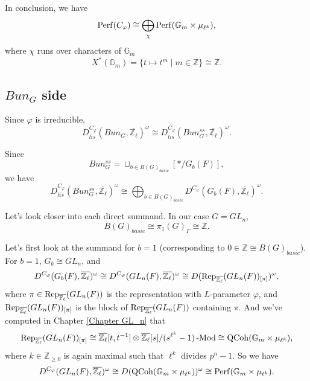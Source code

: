 In conclusion, we have 
$$\operatorname{\operatorname{Perf}}(C_{\varphi}) \cong \bigoplus_{\chi}\operatorname{\operatorname{Perf}}(\mathbb{G}_m \times \mu_{\ell^k}),$$
where $\chi$ runs over characters of $\mathbb{G}_m$ 
$$X^*(\mathbb{G}_m)=\{t \mapsto t^m \;|\; m \in \mathbb{Z}\} \cong \mathbb{Z}.$$


\subsection{$Bun_G$ side}

Since $\varphi$ is irreducible, 
$$D^{C_{\varphi}}_{lis}(Bun_G, \overline{\mathbb{Z}_{\ell}})^{\omega} \cong D^{C_{\varphi}}_{lis}(Bun_G^{ss}, \overline{\mathbb{Z}_{\ell}})^{\omega}.$$

Since
$$Bun_G^{ss}=\sqcup_{b \in B(G)_{basic}}[*/G_b(F)],$$
we have 
$$D^{C_{\varphi}}_{lis}(Bun_G^{ss}, \overline{\mathbb{Z}_{\ell}})^{\omega} \cong \bigoplus_{b \in B(G)_{basic}}D^{C_{\varphi}}(G_b(F), \overline{\mathbb{Z}_{\ell}})^{\omega}.$$

Let's look closer into each direct summand. In our case $G=GL_n$, 
$$B(G)_{basic} \cong \pi_1(G)_{\Gamma} \cong \mathbb{Z}.$$ 

Let's first look at the summand for $b=1$ (corresponding to $0 \in \mathbb{Z} \cong B(G)_{basic}$). For $b=1$, $G_b \cong GL_n$, and 
$$D^{C_{\varphi}}(G_b(F), \overline{\mathbb{Z}_{\ell}})^{\omega} \cong D^{C_{\varphi}}(GL_n(F), \overline{\mathbb{Z}_{\ell}})^{\omega} \cong D(\operatorname{\operatorname{Rep}}_{\overline{\mathbb{Z}_{\ell}}}(GL_n(F))_{[\pi]})^{\omega},$$
where $\pi \in \operatorname{\operatorname{Rep}}_{\overline{\mathbb{F}_{\ell}}}(GL_n(F))$ is the representation with $L$-parameter $\varphi$, and $\operatorname{\operatorname{Rep}}_{\overline{\mathbb{Z}_{\ell}}}(GL_n(F))_{[\pi]}$ is the block of $\operatorname{\operatorname{Rep}}_{\overline{\mathbb{Z}_{\ell}}}(GL_n(F))$ containing $\pi$.
And we've computed in Chapter \ref{Chapter GL_n} that
$$\operatorname{\operatorname{Rep}}_{\overline{\mathbb{Z}_{\ell}}}(GL_n(F))_{[\pi]} \cong \overline{\mathbb{Z}_{\ell}}[t, t^{-1}] \otimes \overline{\mathbb{Z}_{\ell}}[s]/(s^{\ell^k}-1)\operatorname{-Mod} \cong \operatorname{\operatorname{QCoh}}(\mathbb{G}_m \times \mu_{\ell^k}),$$
where $k \in \mathbb{Z}_{\geq 0}$ is again maximal such that $\ell^k$ divides $p^n-1$. So we have
$$D^{C_{\varphi}}(GL_n(F), \overline{\mathbb{Z}_{\ell}})^{\omega} \cong D(\operatorname{\operatorname{QCoh}}(\mathbb{G}_m \times \mu_{\ell^k}))^{\omega} \cong \operatorname{\operatorname{Perf}}(\mathbb{G}_m \times \mu_{\ell^k}).$$

